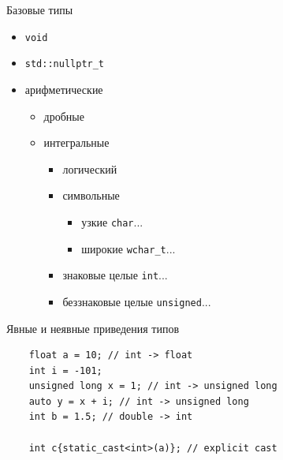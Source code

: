 \documentclass[unknownkeysallowed,xcolor=table]{beamer}
\begin{document}
\begin{frame}{Базовые типы}
  \begin{itemize}
    \item \lstinline{void}
    \item \lstinline{std::nullptr_t}
    \item арифметические
      \begin{itemize}
        \item дробные
        \item интегральные
          \begin{itemize}
            \item логический
            \item символьные
              \begin{itemize}
                \item узкие \lstinline{char}...
                \item широкие \lstinline{wchar_t}...
              \end{itemize}
            \item знаковые целые \lstinline{int}...
            \item беззнаковые целые \lstinline{unsigned}...
          \end{itemize}
      \end{itemize}
  \end{itemize}
\end{frame}

\begin{frame}[fragile]{Явные и неявные приведения типов}
  \begin{lstlisting}
    float a = 10; // int -> float
    int i = -101;
    unsigned long x = 1; // int -> unsigned long
    auto y = x + i; // int -> unsigned long
    int b = 1.5; // double -> int

    int c{static_cast<int>(a)}; // explicit cast
  \end{lstlisting}
\end{frame}
\end{document}
